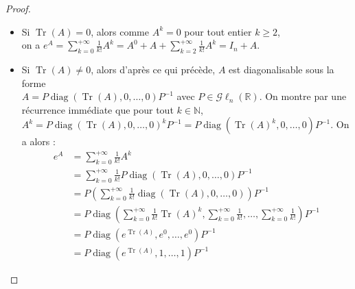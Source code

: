 \documentclass[a4paper]{article}
\begin{document}
\begin{proof}
    \begin{itemize}
        \item Si $\operatorname{Tr}(A) = 0$, alors comme $A^k = 0$ pour tout entier $k \geq 2$,\\ on a $\displaystyle e^A = \sum_{k=0}^{+\infty} \frac{1}{k!}A^k = A^0 + A + \sum_{k=2}^{+\infty} \frac{1}{k!}A^k = I_n + A$.
        \item Si $\operatorname{Tr}(A) \neq 0$, alors d'après ce qui précède, $A$ est diagonalisable sous la forme \\ $A = P \operatorname{diag}(\operatorname{Tr}(A), 0, \dots, 0)P^{-1}$ avec $P \in \mathcal{G}\ell_n(\mathbb{R})$. On montre par une récurrence immédiate que pour tout $k \in \mathbb{N}$, $A^k =  P \operatorname{diag}(\operatorname{Tr}(A), 0, \dots, 0)^kP^{-1} =  P \operatorname{diag}\left(\operatorname{Tr}(A)^k, 0, \dots, 0\right)P^{-1}$. On a alors :
        \begin{align*}
            e^A &= \sum_{k=0}^{+\infty} \frac{1}{k!}A^k\\
            &= \sum_{k=0}^{+\infty}  \frac{1}{k!} P \operatorname{diag}(\operatorname{Tr}(A), 0, \dots, 0)P^{-1}\\
            &= P \left(\sum_{k=0}^{+\infty}  \frac{1}{k!} \operatorname{diag}(\operatorname{Tr}(A), 0, \dots, 0)\right) P^{-1}\\
            &= P \operatorname{diag}\left(\sum_{k=0}^{+\infty}  \frac{1}{k!} \operatorname{Tr}(A)^k, \sum_{k=0}^{+\infty}  \frac{1}{k!}, \dots, \sum_{k=0}^{+\infty}  \frac{1}{k!}\right) P^{-1}\\
            &= P \operatorname{diag}\left(e^{\operatorname{Tr}(A)}, e^0, \dots, e^0\right) P^{-1}\\
            &= P\operatorname{diag}\left(e^{\operatorname{Tr}(A)}, 1, \dots, 1\right)P^{-1}
        \end{align*}
    \end{itemize}
\end{proof}
\end{document}
